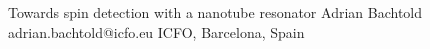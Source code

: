 \begin{conf-abstract}[]
{Towards spin detection with a nanotube resonator}
{\color{blue} Adrian Bachtold}
{adrian.bachtold@icfo.eu}
{ICFO, Barcelona, Spain}
{\decofourleft \decofourright}





\printbibliography[heading=none]

\end{conf-abstract}
